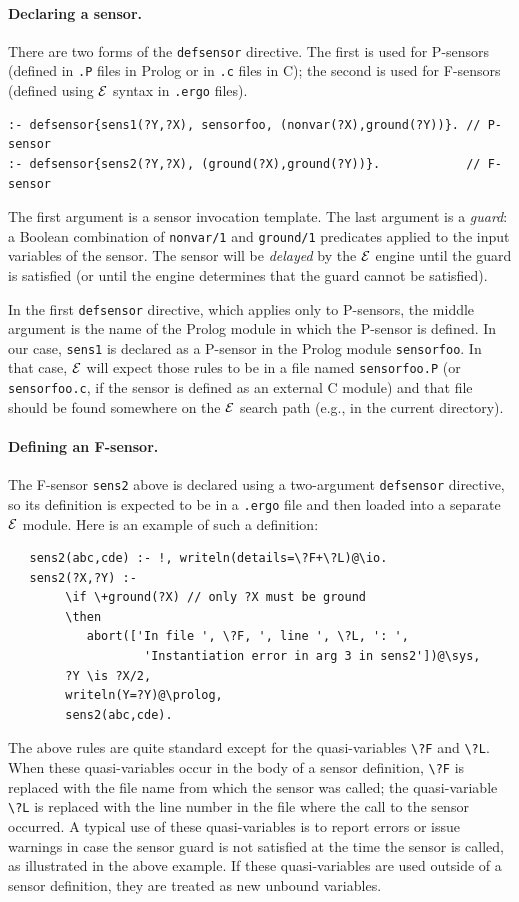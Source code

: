 \documentclass[11pt]{article}
\newcommand{\ERGO}{\mbox{\ensuremath{\cal{E}}\smaller{{\sc{RGO}}}}\xspace}
\newcommand{\FLSYSTEM}{\ERGO}
\newcommand{\ergoext}{ergo\xspace}
\newcommand{\bs}{\textbackslash}
\begin{document}
\paragraph{Declaring a sensor.}
There are two forms of the \texttt{defsensor} directive. The first is used for
P-sensors (defined in \texttt{.P} files in Prolog or in \texttt{.c} files
in C); the second is used for
F-sensors (defined using \FLSYSTEM syntax in \texttt{.\ergoext} files).
\begin{verbatim}
:- defsensor{sens1(?Y,?X), sensorfoo, (nonvar(?X),ground(?Y))}. // P-sensor
:- defsensor{sens2(?Y,?X), (ground(?X),ground(?Y))}.            // F-sensor
\end{verbatim}
The first argument is a sensor invocation template.  The last argument
is a \emph{guard}: a Boolean combination of \texttt{nonvar/1} and
\texttt{ground/1} predicates applied to the input variables of the
sensor. The sensor will be \emph{delayed} by the \FLSYSTEM engine until the
guard is satisfied (or until the engine determines that the guard cannot be
satisfied).

In the first \texttt{defsensor} directive, which applies only to P-sensors,
the middle argument is the name
of the Prolog module in which the P-sensor is defined. 
In our case, \texttt{sens1} is declared as a P-sensor
in the Prolog module \texttt{sensorfoo}. In that case, \FLSYSTEM
will expect those rules to be in a file named \texttt{sensorfoo.P}
(or \texttt{sensorfoo.c}, if the sensor is defined as an external C module)
and that file should be found somewhere on the \FLSYSTEM search path (e.g., in
the current directory).

\paragraph{Defining an F-sensor.}
The F-sensor \texttt{sens2} above is declared using a
two-argument \texttt{defsensor}  directive, so its definition is expected to be in a
\texttt{.\ergoext} file and then loaded into a separate \FLSYSTEM module.
Here is an example of such a definition:
\begin{verbatim}
   sens2(abc,cde) :- !, writeln(details=\?F+\?L)@\io.
   sens2(?X,?Y) :-
        \if \+ground(?X) // only ?X must be ground
        \then
           abort(['In file ', \?F, ', line ', \?L, ': ',
                   'Instantiation error in arg 3 in sens2'])@\sys,
        ?Y \is ?X/2,
        writeln(Y=?Y)@\prolog,
        sens2(abc,cde).
\end{verbatim}
The above rules are quite standard except for the quasi-variables
\texttt{\bs{}?F} and \texttt{\bs{}?L}. When these quasi-variables occur in the body of a
sensor definition, \texttt{\bs{}?F} is replaced with the file name from which
the sensor was called; the quasi-variable \texttt{\bs{}?L} is replaced with the line
number in the file where the call to the sensor occurred.
A typical use of these quasi-variables is to report errors or issue warnings in case
the sensor guard is not satisfied at the time the sensor is called, as
illustrated in the above example.
If these quasi-variables are used outside of a sensor definition, they are treated
as new unbound variables.
\end{document}
